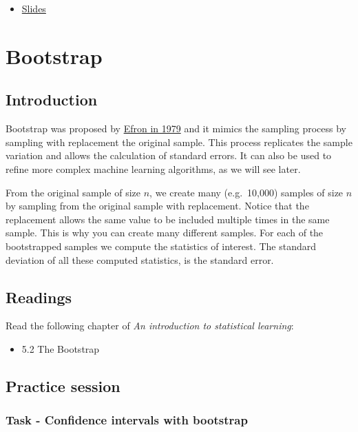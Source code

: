 \documentclass[
]{book}
\providecommand{\tightlist}{%
  \setlength{\itemsep}{0pt}\setlength{\parskip}{0pt}}
\begin{document}
\begin{itemize}
\tightlist
\item
  \href{https://www.dropbox.com/s/wbwlcxwxnyf4bvi/Module-3-Resampling-methods_2020.pdf?dl=0}{Slides}
\end{itemize}

\chapter{Bootstrap}\label{bootstrap}

\section{Introduction}\label{boot.intro}

Bootstrap was proposed by
\href{https://projecteuclid.org/download/pdf_1/euclid.aos/1176344552}{Efron in 1979}
and it mimics the sampling process by sampling with replacement
the original sample. This process replicates the sample variation and allows
the calculation of standard errors. It can also be used to refine more
complex machine learning algorithms, as we will see later.

From the original sample of size \(n\), we create many (e.g.~10,000) samples of
size \(n\) by sampling from the original sample with replacement. Notice that the replacement
allows the same value to be included multiple times in the same sample. This
is why you can create many different samples.
For each of the bootstrapped samples we compute the statistics of interest. The
standard deviation of all these computed statistics, is the standard error.

\section{Readings}\label{boot.read}

Read the following chapter of \emph{An introduction to statistical learning}:

\begin{itemize}
\tightlist
\item
  5.2 The Bootstrap
\end{itemize}

\section{Practice session}\label{boot.prac}

\subsection*{Task - Confidence intervals with bootstrap}\label{task---confidence-intervals-with-bootstrap}
\end{document}
